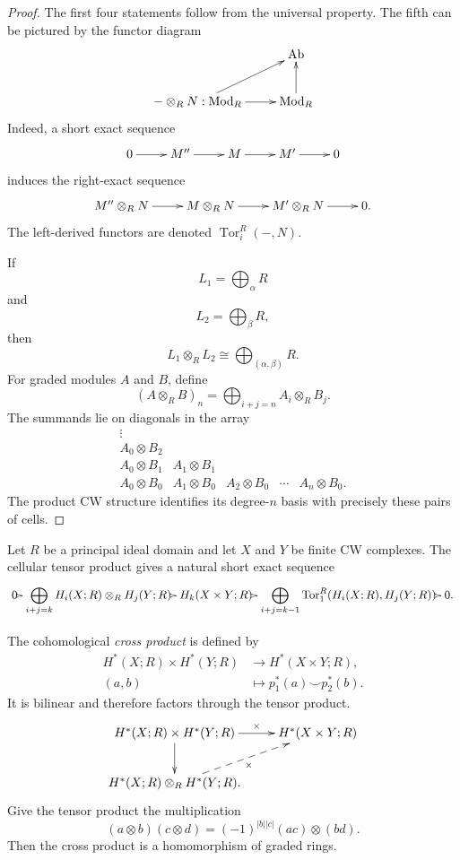 \begin{proof}
The first four statements follow from the
universal property.  The fifth can be
pictured by the functor diagram
$$
\xymatrix{
  & \operatorname{Ab} \\
-\otimes_RN:
\operatorname{Mod}_R
  \ar[r]
  \ar[ur]
  & \operatorname{Mod}_R \ar[u].
}
$$
Indeed, a short exact sequence
$$
\xymatrix{
0 \ar[r]
  & M'' \ar[r]
  & M \ar[r]
  & M' \ar[r]
  & 0
}
$$
induces the right-exact sequence
$$
\xymatrix{
M''\otimes_RN \ar[r]
  & M\otimes_RN \ar[r]
  & M'\otimes_RN \ar[r]
  & 0.
}
$$
The left-derived functors are denoted
$\operatorname{Tor}^R_i(-,N)$.

\noindent
If
$$
L_1=\bigoplus_\alpha R
$$
and
$$
L_2=\bigoplus_\beta R,
$$
then
$$
L_1\otimes_RL_2
\cong
\bigoplus_{(\alpha,\beta)}R.
$$
For graded modules $A$ and $B$, define
$$
(A\otimes_RB)_n
=
\bigoplus_{i+j=n}A_i\otimes_RB_j.
$$
The summands lie on diagonals in the array
$$
\begin{matrix}
\vdots&&&&\\
A_0\otimes B_2&&&&\\
A_0\otimes B_1&A_1\otimes B_1&&&\\
A_0\otimes B_0&A_1\otimes B_0
&A_2\otimes B_0&\cdots&A_n\otimes B_0.
\end{matrix}
$$
The product CW structure identifies its
degree-$n$ basis with precisely these
pairs of cells.
\end{proof}

\noindent
Let $R$ be a principal ideal domain and let
$X$ and $Y$ be finite CW complexes.  The
cellular tensor product gives a natural
short exact sequence
{\small
$$
\xymatrix@C=.1em{
0 \ar[r]
  & \displaystyle\bigoplus_{i+j=k}
    H_i(X;R)\otimes_RH_j(Y;R)
    \ar[r]
  & H_k(X\times Y;R) \ar[r]
  & \displaystyle\bigoplus_{i+j=k-1}
    \operatorname{Tor}^R_1
    (H_i(X;R),H_j(Y;R))
    \ar[r]
  & 0.
}
$$
}

\noindent
The cohomological {\it cross product} is
defined by
$$
\begin{aligned}
H^*(X;R)\times H^*(Y;R)
&\longrightarrow H^*(X\times Y;R),
\\
(a,b)&\longmapsto
p_1^*(a)\smile p_2^*(b).
\end{aligned}
$$
It is bilinear and therefore factors
through the tensor product.
$$
\xymatrix{
H^*(X;R)\times H^*(Y;R)
  \ar[r]^-\times \ar[d]
  & H^*(X\times Y;R) \\
H^*(X;R)\otimes_RH^*(Y;R)
  \ar@{-->}[ur]_-\times.
}
$$
Give the tensor product the multiplication
$$
(a\otimes b)(c\otimes d)
=
(-1)^{|b||c|}(ac)\otimes(bd).
$$
Then the cross product is a homomorphism of
graded rings.

